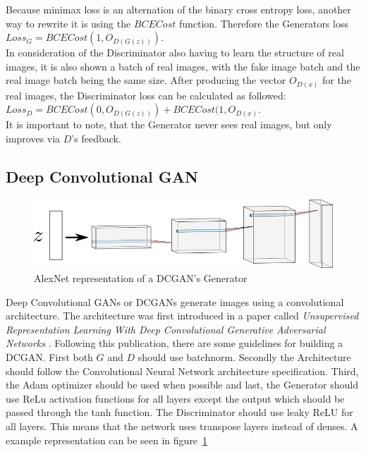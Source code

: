 \documentclass{article}
\begin{document}
Because minimax loss is an alternation of the binary cross entropy loss, another way to rewrite it is using the $BCECost$ function. Therefore the Generators loss $Loss_G = BCECost(1, O_{D(G(z))})$. \\
In consideration of the Discriminator also having to learn the structure of real images, it is also shown a batch of real images, with the fake image batch and the real image batch being the same size. After producing the vector $O_{D(x)}$ for the real images, the Discriminator loss can be calculated as followed: $Loss_D = BCECost(0, O_{D(G(z))}) + BCECost(1, O_{D(x)}$.\\
It is important to note, that the Generator never sees real images, but only improves via $D$'s feedback.

\subsection{Deep Convolutional GAN}
\begin{figure}[!ht]
    \centering
    \includegraphics[width=0.5\linewidth]{images/DCGAN.png}
    \caption[AlexNet representation of a DCGAN's Generator; made with \url{https://alexlenail.me/NN-SVG/index.html}]{AlexNet representation of a DCGAN's Generator}
    \label{fig:dcgan_alexnet}
\end{figure}
Deep Convolutional GANs or DCGANs generate images using a convolutional architecture. The architecture was first introduced in a paper called \textit{Unsupervised Representation Learning With Deep Convolutional Generative Adversarial Networks} \autocite{radford_unsupervised_2016}.
Following this publication, there are some guidelines for building a DCGAN. First both $G$ and $D$ should use \gls{batchnorm}. Secondly the Architecture should follow the Convolutional Neural Network architecture specification. Third, the Adam optimizer should be used when possible and last, the Generator should use ReLu activation functions for all layers except the output which should be passed through the tanh function. The Discriminator should use leaky ReLU for all layers.
This means that the network uses transpose layers instead of \glspl{dense}. A example representation can be seen in figure~\ref{fig:dcgan_alexnet}
\end{document}
